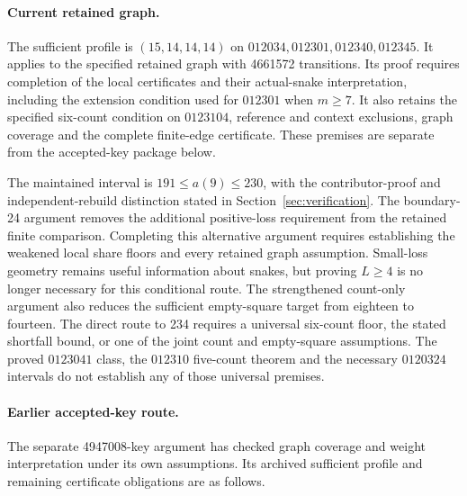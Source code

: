 \documentclass[11pt,a4paper]{article}
\theoremstyle{definition}
\theoremstyle{remark}
\begin{document}
\paragraph{Current retained graph.}
The sufficient profile is $(15,14,14,14)$ on
$012034,012301,012340,012345$. It applies to the specified retained
graph with 4661572 transitions. Its proof requires completion of the local
certificates and their actual-snake interpretation, including the
extension condition used for $012301$ when $m\ge7$. It also retains the
specified six-count condition on $0123104$, reference and context
exclusions, graph coverage and the complete finite-edge certificate.
These premises are separate from the accepted-key package below.


The maintained interval is $191\le a(9)\le230$, with the contributor-proof
and independent-rebuild distinction stated in Section~\ref{sec:verification}.
The boundary-24 argument removes the additional positive-loss requirement
from the retained finite comparison. Completing this alternative argument requires establishing the weakened
local share floors and every retained graph assumption. Small-loss geometry remains useful information about snakes,
but proving $L\ge4$ is no longer necessary for this conditional route.
The strengthened count-only argument also reduces the sufficient
empty-square target from eighteen to fourteen.
The direct route to 234 requires a universal six-count floor, the stated
shortfall bound, or one of the joint count and empty-square assumptions.
The proved $0123041$ class, the $012310$ five-count theorem and the necessary
$0120324$ intervals do not establish any of those universal premises.
\paragraph{Earlier accepted-key route.}
The separate 4947008-key argument has checked graph coverage and weight
interpretation under its own assumptions. Its archived sufficient
profile and remaining certificate obligations are as follows.
\end{document}
